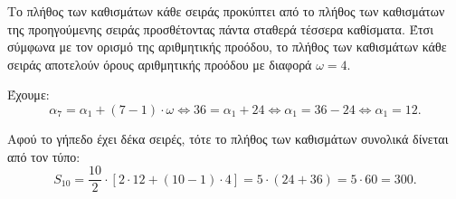 
\begin{alist}
\item Το πλήθος των καθισμάτων κάθε σειράς προκύπτει από το πλήθος των καθισμάτων της
προηγούμενης σειράς προσθέτοντας πάντα σταθερά τέσσερα καθίσματα.
Έτσι σύμφωνα με τον ορισμό της αριθμητικής προόδου, το πλήθος των καθισμάτων κάθε
σειράς αποτελούν όρους αριθμητικής προόδου με διαφορά $\omega = 4$.

\item Έχουμε:
\[\alpha_7 = \alpha_1 + (7 - 1) \cdot \omega \Leftrightarrow 36 = \alpha_1 + 24 \Leftrightarrow \alpha_1 = 36 - 24 \Leftrightarrow \alpha_1 = 12.\]

\item Αφού το γήπεδο έχει δέκα σειρές, τότε το πλήθος των καθισμάτων συνολικά δίνεται από
τον τύπο:
\[S_{10} = \dfrac{10}{2} \cdot [2 \cdot 12 + (10 - 1) \cdot 4] = 5 \cdot (24 + 36) = 5 \cdot 60 = 300.\]
\end{alist}

